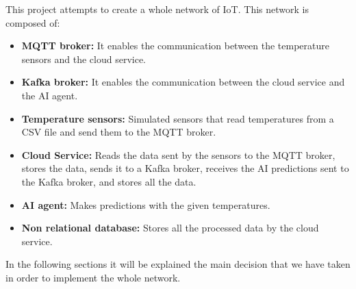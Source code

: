 \documentclass[../informe.tex]{subfiles}
\begin{document}
This project attempts to create a whole network of IoT. This network is composed of:
\begin{itemize}
  \item \textbf{MQTT broker:} It enables the communication between the temperature sensors and the cloud service.
  \item \textbf{Kafka broker:} It enables the communication between the cloud service and the AI agent.
  \item \textbf{Temperature sensors:} Simulated sensors that read temperatures from a CSV file and send them to the MQTT broker.
  \item \textbf{Cloud Service:} Reads the data sent by the sensors to the MQTT broker, stores the data, sends it to a Kafka broker, receives the AI predictions sent to the Kafka broker, and stores all the data.
  \item \textbf{AI agent:} Makes predictions with the given temperatures.
  \item \textbf{Non relational database:} Stores all the processed data by the cloud service.
\end{itemize}

In the following sections it will be explained the main decision that we have taken in order to implement the whole network.
\end{document}
